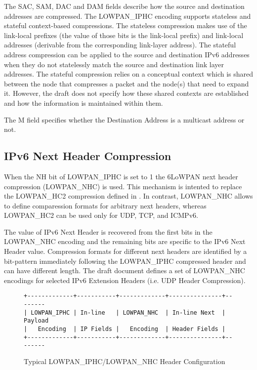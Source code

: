 \documentclass[a4paper,11pt,oneside]{article}
\newenvironment{mylisting}
{\begin{list}{}{\setlength{\leftmargin}{1em}}\item\footnotesize\bfseries}
{\end{list}}
\begin{document}
The SAC, SAM, DAC and DAM fields describe how the source and destination addresses are compressed. The LOWPAN\_IPHC encoding supports stateless and stateful context-based compressions. The stateless compression makes use of the link-local prefixes (the value of those bits is the link-local prefix) and link-local addresses (derivable from the corresponding link-layer address). The stateful address compression can be applied to the source and destination IPv6 addresses when they do not statelessly match the source and destination link layer addresses.    
The stateful compression relies on a conceptual context which is shared between the node that compresses a packet and the node(s) that need to expand it. However, the draft does not specify how these shared contexts are established and how the information is maintained within them.

The M field specifies whether the Destination Address is a multicast address or not.


\subsection{IPv6 Next Header Compression} \label{sec:ipnh}
When the NH bit of LOWPAN\_IPHC is set to 1 the 6LoWPAN next header compression (LOWPAN\_NHC) is used. 
This mechanism is intented to replace the LOWPAN\_HC2 compression defined in \cite{rfc4944}. In contrast, LOWPAN\_NHC allows to define comparession formats for arbitrary next headers, whereas LOWPAN\_HC2 can be used only for UDP, TCP, and ICMPv6.

The value of IPv6 Next Header is recovered from the first bits in the LOWPAN\_NHC encoding and the remaining 
bits are specific to the IPv6 Next Header value. Compression formats for different next headers are identified by a
bit-pattern immediately following the LOWPAN\_IPHC compressed header and can have different length.
The draft document defines a set of LOWPAN\_NHC encodings for selected IPv6 Extension Headers (i.e. UDP Header Compression).
\begin{figure}[htp]
\centering
\begin{mylisting}
\begin{verbatim}
+-------------+-----------+-------------+---------------+--------
| LOWPAN_IPHC | In-line   | LOWPAN_NHC  | In-line Next  | Payload
|   Encoding  | IP Fields |   Encoding  | Header Fields |
+-------------+-----------+-------------+---------------+--------
\end{verbatim}
\end{mylisting}
\caption{Typical LOWPAN\_IPHC/LOWPAN\_NHC Header Configuration}\label{fig:lowpaniphc}
\end{figure}


\nocite{rfc2460} 
\nocite{rfc4291} 
\nocite{rfc4944} 
\nocite{draft-hc-06} 
 
 
 
\end{document}
